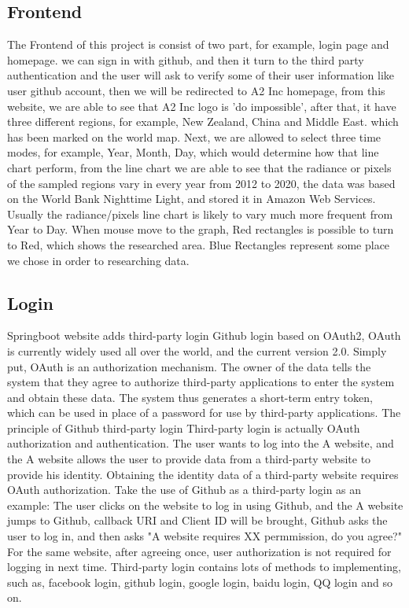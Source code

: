 \documentclass[conference]{IEEEtran}
\begin{document}
\subsection{Frontend}
The Frontend of this project is consist of two part, for example, login page and homepage.
we can sign in with github, and then it turn to the third party authentication and the user
will ask to verify some of their user information like user github account, then we will
be redirected to A2 Inc homepage, from this website, we are able to see that A2 Inc logo
is 'do impossible', after that, it have three different regions, for example, New Zealand,
China and Middle East. which has been marked on the world map. Next, we are allowed to select
three time modes, for example, Year, Month, Day, which would determine how that line chart
perform, from the line chart we are able to see that the radiance or pixels of the sampled
regions vary in every year from 2012 to 2020, the data was based on the World Bank Nighttime
Light, and stored it in Amazon Web Services. Usually the radiance/pixels line chart is likely
to vary much more frequent from Year to Day. When mouse move to the graph, Red rectangles
is possible to turn to Red, which shows the researched area. Blue Rectangles represent some
place we chose in order to researching data.

\subsection{Login}
Springboot website adds third-party login Github login based on OAuth2, OAuth is currently widely used all over the world, and the current version 2.0. Simply put,
OAuth is an authorization mechanism. The owner of the data tells the system that they agree to authorize
third-party applications to enter the system and obtain these data. The system thus generates a short-term
entry token, which can be used in place of a password for use by third-party applications. The principle of Github third-party login
Third-party login is actually OAuth authorization and authentication. The user wants to log into the
A website, and the A website allows the user to provide data from a third-party website to provide his
identity. Obtaining the identity data of a third-party website requires OAuth authorization.
Take the use of Github as a third-party login as an example: The user clicks on the website to log in using Github, and the A website jumps to Github, callback
URI and Client ID will be brought, Github asks the user to log in, and then asks "A website requires XX permmission, do you agree?"
For the same website, after agreeing once, user authorization is not required for logging in next time. Third-party login contains
lots of methods to implementing, such as, facebook login, github login, google login,
baidu login, QQ login and so on.
\end{document}

